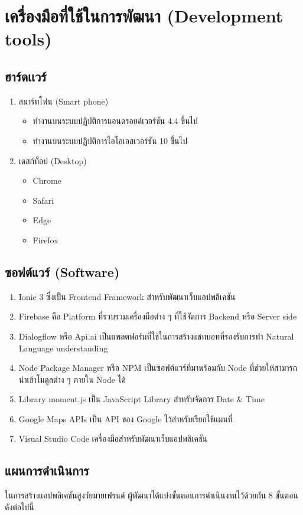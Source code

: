 \section{เครื่องมือที่ใช้ในการพัฒนา (Development tools)}
\subsection{ฮาร์ดเเวร์}
\begin{enumerate}
	\item สมาร์ทโฟน (Smart phone)
		\begin{itemize}
			\item ทำงานบนระบบปฏิบัติการแอนดรอยด์เวอร์ชัน 4.4 ขึ้นไป
			\item ทำงานบนระบบปฏิบัติการไอโอเอสเวอร์ชัน 10 ขึ้นไป
		\end{itemize}
		\item เดสก์ท็อป (Desktop)
		\begin{itemize}
			\item Chrome
			\item Safari
			\item Edge
			\item Firefox
		\end{itemize}
\end{enumerate}

\subsection{ซอฟต์แวร์ (Software)}
\begin{enumerate}
	\item Ionic 3 ซึ่งเป็น Frontend Framework สำหรับพัฒนาเว็บแอปพลิเคชัน
	\item Firebase คือ Platform ที่รวบรวมเครื่องมือต่าง ๆ ที่ใช้จัดการ Backend หรือ Server side
	\item Dialogflow หรือ Api.ai เป็นแพลตฟอร์มที่ใช้ในการสร้างแชทบอทที่รองรับการทำ Natural Language understanding
	\item Node Package Manager หรือ NPM เป็นซอฟต์แวร์ที่มาพร้อมกับ Node ที่ช่วยให้สามารถนำเข้าโมดูลต่าง ๆ ภายใน Node ได้
	\item Library moment.js เป็น JavaScript Library สำหรับจัดการ Date & Time
	\item Google Maps APIs เป็น API ของ Google ไว้สำหรับเรียกใช้แผนที่
	\item Visual Studio Code เครื่องมือสำหรับพัฒนาเว็บแอปพลิเคชัน
\end{enumerate}

\newpage
\subsection{แผนการดำเนินการ}
	ในการสร้างแอปพลิเคชันสูงวัยมายเฟรนด์ ผู้พัฒนาได้แบ่งขั้นตอนการดำเนินงานไว้ด้วยกัน 8 ขั้นตอน ดังต่อไปนี้

